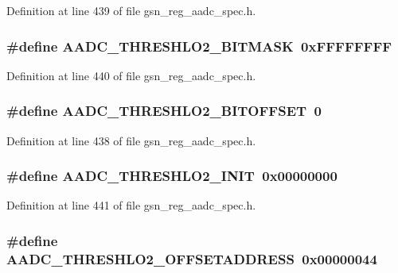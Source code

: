 Definition at line 439 of file gsn\_\-reg\_\-aadc\_\-spec.h.

\hypertarget{a00543_aeed2c2fbcf77b1e61df50654c8a10717}{
\subsubsection[{AADC\_\-THRESHLO2\_\-BITMASK}]{\setlength{\rightskip}{0pt plus 5cm}\#define AADC\_\-THRESHLO2\_\-BITMASK~0xFFFFFFFF}}
\label{a00543_aeed2c2fbcf77b1e61df50654c8a10717}


Definition at line 440 of file gsn\_\-reg\_\-aadc\_\-spec.h.

\hypertarget{a00543_a49e65d27e65fe6352d8ea7076f4792cb}{
\subsubsection[{AADC\_\-THRESHLO2\_\-BITOFFSET}]{\setlength{\rightskip}{0pt plus 5cm}\#define AADC\_\-THRESHLO2\_\-BITOFFSET~0}}
\label{a00543_a49e65d27e65fe6352d8ea7076f4792cb}


Definition at line 438 of file gsn\_\-reg\_\-aadc\_\-spec.h.

\hypertarget{a00543_a226e67f47470d84e352ee50344c8065a}{
\subsubsection[{AADC\_\-THRESHLO2\_\-INIT}]{\setlength{\rightskip}{0pt plus 5cm}\#define AADC\_\-THRESHLO2\_\-INIT~0x00000000}}
\label{a00543_a226e67f47470d84e352ee50344c8065a}


Definition at line 441 of file gsn\_\-reg\_\-aadc\_\-spec.h.

\hypertarget{a00543_a7ab9b74ae5f69e5e7a3cf796511d96c6}{
\subsubsection[{AADC\_\-THRESHLO2\_\-OFFSETADDRESS}]{\setlength{\rightskip}{0pt plus 5cm}\#define AADC\_\-THRESHLO2\_\-OFFSETADDRESS~0x00000044}}
\label{a00543_a7ab9b74ae5f69e5e7a3cf796511d96c6}


